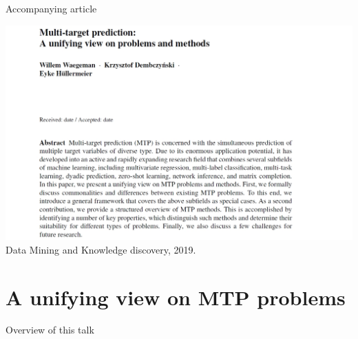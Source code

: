 \documentclass[]{beamer}
\begin{document}
\begin{frame}{Accompanying article}

\begin{center}
\includegraphics[width=\textwidth,trim = 0 0 0 0,clip]{Figures/dami}\\
Data Mining and Knowledge discovery, 2019. 
\end{center}

\end{frame}




\section{A unifying view on MTP problems}


\begin{frame}{Overview of this talk}

\tableofcontents

\end{frame}
\end{document}
